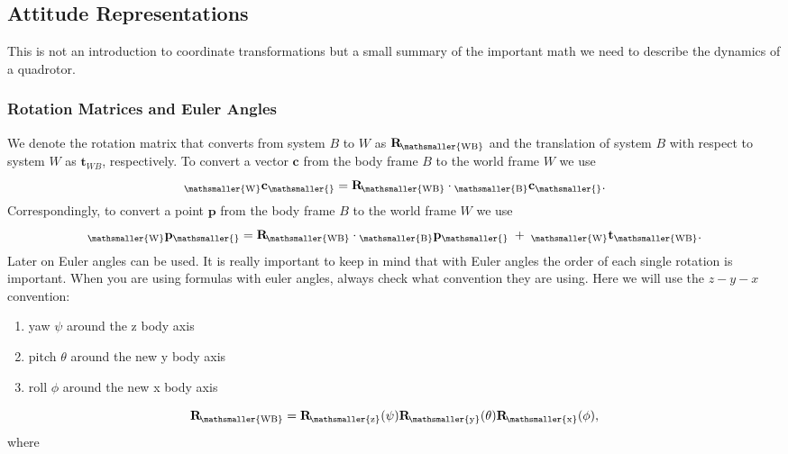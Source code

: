 \documentclass[10pt,a4paper,fleqn]{article}
\newcommand{\pos}[0]{\bVec{p}} %
\newcommand{\bVec}[1]{\mathbf{#1}}
\newcommand{\vect}[3]{{_{\mathsmaller{\mathrm{#2}}}\mathbf{#1}_{\mathsmaller{\mathrm{#3}}}}} %
\newcommand{\wfr}[0]{\ensuremath{W}} %
\newcommand{\bfr}[0]{\ensuremath{B}} %
\newcommand{\ori}[1]{\bVec{R}_{\!\mathsmaller{\mathrm{#1}}}} %
\newcommand{\thrust}[0]{c} %
\begin{document}
\subsection{Attitude Representations}

This is not an introduction to coordinate transformations but a small summary of the important math we need to describe the dynamics of a quadrotor.

\subsubsection{Rotation Matrices and Euler Angles}\label{sec:traforotmat}

We denote the rotation matrix that converts from system $\bfr$ to $\wfr$ as $\ori{\wfr \bfr}$ and the translation of system $\bfr$ with respect to system $\wfr$ as $\bVec{t}_{\wfr \bfr}$, respectively.
To convert a vector $\bVec{c}$ from the body frame $\bfr$ to the world frame $\wfr$ we use
%
\begin{equation}
	\vect{\thrust}{\wfr}{} = \ori{\wfr \bfr} \cdot \vect{\thrust}{\bfr}{} .
\end{equation}
%
Correspondingly, to convert a point $\bVec{p}$ from the body frame $\bfr$ to the world frame $\wfr$ we use
%
\begin{equation}
	\vect{\pos}{\wfr}{} = \ori{\wfr \bfr} \cdot \vect{\pos}{\bfr}{} \; + \; \vect{t}{\wfr}{\wfr \bfr} .
\end{equation}
%
Later on Euler angles can be used.
It is really important to keep in mind that with Euler angles the order of each single rotation is important. 
When you are using formulas with euler angles, always check what convention they are using.
Here we will use the $z-y-x$ convention:
%
\begin{enumerate}
\item yaw $\psi$ around the z body axis
\item pitch $\theta$ around the new y body axis
\item roll $\phi$ around the new x body axis
\end{enumerate}
%
\begin{equation}
	\ori{\wfr \bfr} = \ori{z}(\psi) \ori{y}(\theta) \ori{x}(\phi) ,	
\end{equation}
%
where
% 
\end{document}
